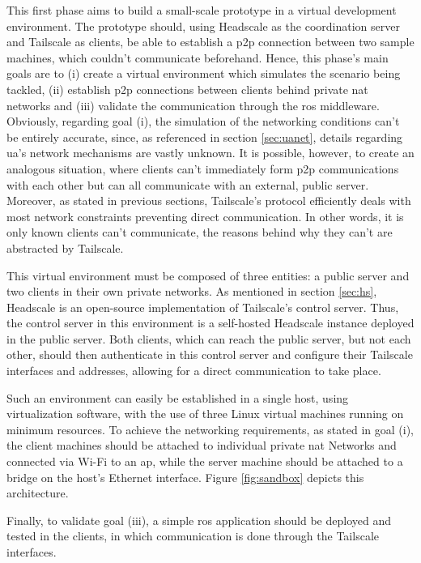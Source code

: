\documentclass[11pt,twoside,a4paper]{report}
\begin{document}
This first phase aims to build a small-scale prototype in a virtual development environment. The prototype should, using Headscale as the coordination server and Tailscale as clients, be able to establish a \ac{p2p} connection between two sample machines, which couldn't communicate beforehand. Hence, this phase's main goals are to (i) create a virtual environment which simulates the scenario being tackled, (ii) establish \ac{p2p} connections between clients behind private \ac{nat} networks  and (iii) validate the communication through the \ac{ros} middleware. Obviously, regarding goal (i), the simulation of the networking conditions can't be entirely accurate, since, as referenced in section \ref{sec:uanet}, details regarding \ac{ua}'s network mechanisms are vastly unknown. It is possible, however, to create an analogous situation, where clients can't immediately form \ac{p2p} communications with each other but can all communicate with an external, public server. Moreover, as stated in previous sections, Tailscale's protocol efficiently deals with most network constraints preventing direct communication. In other words, it is only known clients can't communicate, the reasons behind why they can't are abstracted by Tailscale.

This virtual environment must be composed of three entities: a public server and two clients in their own private networks. As mentioned in section \ref{sec:hs}, Headscale is an open-source implementation of Tailscale's control server. Thus, the control server in this environment is a self-hosted Headscale instance deployed in the public server. Both clients, which can reach the public server, but not each other, should then authenticate in this control server and configure their Tailscale interfaces and addresses, allowing for a direct communication to take place.

Such an environment can easily be established in a single host, using virtualization software, with the use of three Linux virtual machines running on minimum resources. To achieve the networking requirements, as stated in goal (i), the client machines should be attached to individual private \ac{nat} Networks and connected via Wi-Fi to an \ac{ap}, while the server machine should be attached to a bridge on the host's Ethernet interface. Figure \ref{fig:sandbox} depicts this architecture.

Finally, to validate goal (iii), a simple \ac{ros} application should be deployed and tested in the clients, in which communication is done through the Tailscale interfaces.
\end{document}
